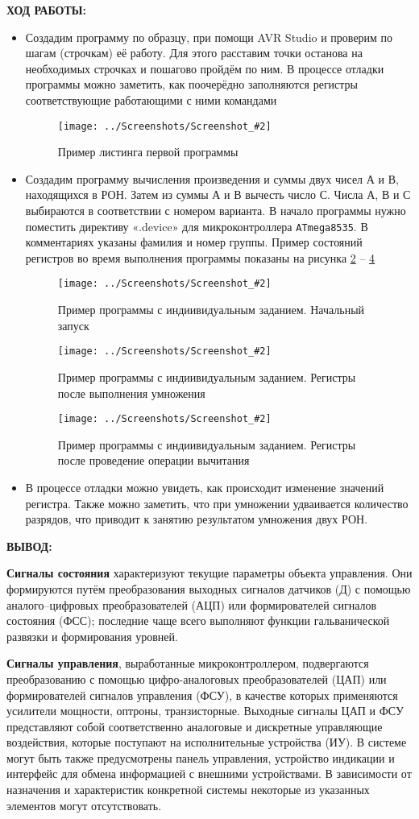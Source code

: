 \documentclass[14pt,a4paper]{extreport}
\newcommand{\sshot}[2]{\begin{figure}[ht]%
\centering\texttt{[image: ../Screenshots/Screenshot\_\#2]}%
\caption{#1}%
\label{sshot#2}%
\end{figure}%
}
\newcommand{\header}[1]{%
{
\clearpage%
\fontsize{16pt}{14pt}\selectfont
\begin{center}
\textbf{\MakeUppercase{#1}:}
\end{center}
}
}
\begin{document}
\header{Ход работы}


\begin{itemize}

\item Создадим программу по образцу, при помощи AVR Studio и проверим по шагам (строчкам) её работу. Для этого расставим точки останова на необходимых строчках и пошагово пройдём по ним. В процессе отладки программы можно заметить, как поочерёдно заполняются регистры соответствующие работающими с ними командами

\sshot{Пример листинга первой программы}{3}

\item Создадим программу вычисления произведения и суммы двух чисел А и В, находящихся в РОН. Затем из суммы А и В вычесть число С. Числа А, В и С выбираются в соответствии с номером варианта. В начало программы нужно поместить директиву «.device» для микроконтроллера \texttt{ATmega8535}. В комментариях указаны фамилия и номер группы. Пример состояний регистров во время выполнения программы показаны на рисунка \ref{sshot4} -- \ref{sshot6}

\sshot{Пример программы с индиивидуальным заданием. Начальный запуск}{4}
\sshot{Пример программы с индиивидуальным заданием. Регистры после выполнения умножения}{5}
\sshot{Пример программы с индиивидуальным заданием. Регистры после проведение операции вычитания}{6}

\item В процессе отладки можно увидеть, как происходит изменение значений регистра. Также можно заметить, что при умножении удваивается количество разрядов, что приводит к занятию результатом умножения двух РОН.

\end{itemize}

\header{Вывод}


\textbf{Сигналы состояния} характеризуют текущие параметры объекта управления. Они формируются путём преобразования выходных сигналов датчиков (Д) с помощью \\ аналого--цифровых преобразователей (АЦП) или формирователей сигналов состояния (ФСС); последние чаще всего выполняют функции гальванической развязки и формирования уровней.

\par

\textbf{Сигналы управления}, выработанные микроконтроллером, подвергаются преобразованию с помощью цифро-аналоговых преобразователей (ЦАП) или формирователей сигналов управления (ФСУ), в качестве которых применяются усилители мощности, оптроны, транзисторные. Выходные сигналы ЦАП и ФСУ представляют собой соответственно аналоговые и дискретные управляющие воздействия, которые поступают на исполнительные устройства (ИУ). В системе могут быть также предусмотрены панель управления, устройство индикации и интерфейс для обмена информацией с внешними устройствами. В зависимости от назначения и характеристик конкретной системы некоторые из указанных элементов могут отсутствовать.
\end{document}
